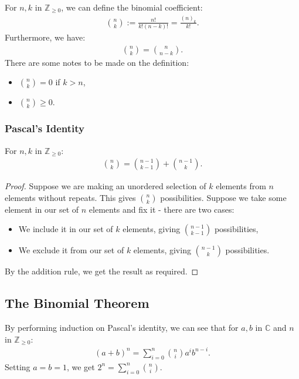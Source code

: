 For $n, k$ in $\mathbb{Z}_{\geq 0}$, we can define the binomial coefficient:  \begin{align*}
 \binom{n}{k} := \frac{n!}{k!(n-k)!} = \frac{(n)_k}{k!}.
\end{align*} Furthermore, we have: \begin{gather*}
  \binom{n}{k} = \binom{n}{n - k}.
\end{gather*} There are some notes to be made on the definition: \begin{itemize}
  \item $\binom{n}{k} = 0$ if $k > n$,
  \item $\binom{n}{k} \geq 0$.
\end{itemize}

\subsubsection{Pascal's Identity}

For $n, k$ in $\mathbb{Z}_{\geq 0}$: \begin{gather*}
  \binom{n}{k} = \binom{n - 1}{k - 1} + \binom{n - 1}{k}.
\end{gather*}
\begin{proof}
  Suppose we are making an unordered selection of $k$ elements
  from $n$ elements without repeats. This gives $\binom{n}{k}$
  possibilities. Suppose we take some element in our set of
  $n$ elements and fix it - there are two cases: \begin{itemize}
    \item We include it in our set of $k$ elements,
    giving $\binom{n - 1}{k - 1}$ possibilities,
    \item We exclude it from our set of $k$ elements,
    giving $\binom{n - 1}{k}$ possibilities.
  \end{itemize} By the addition rule, we get the result as required.
\end{proof}

\subsection{The Binomial Theorem}

By performing induction on Pascal's identity, we can see that for 
$a, b$ in $\mathbb{C}$ and $n$ in $\mathbb{Z}_{\geq 0}$: \begin{gather*}
  (a + b)^n = \sum_{i = 0}^n \binom{n}{i}a^ib^{n - i}.
\end{gather*} Setting $a = b = 1$, we get $2^n = \sum_{i = 0}^n 
\binom{n}{i}$.

